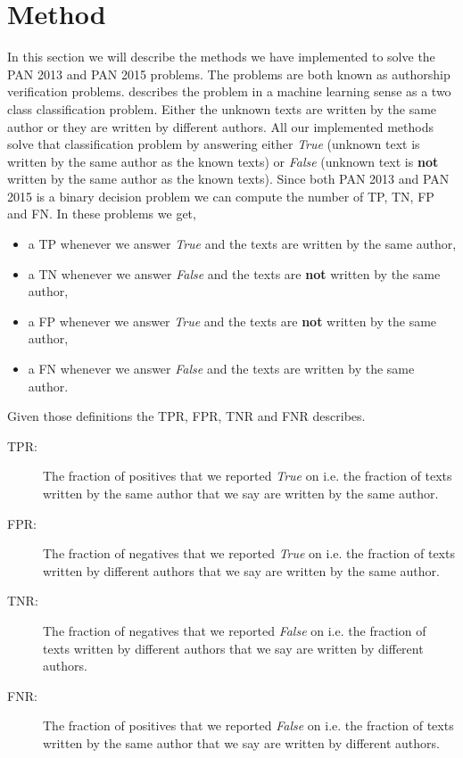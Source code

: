 \section{Method} \label{sec:method}
In this section we will describe the methods we have implemented to solve the
PAN 2013 and PAN 2015 problems. The problems are both known as authorship
verification problems. \cite{stamatos2009} describes the problem in a machine
learning sense as a two class classification problem. Either the unknown texts
are written by the same author or they are written by different authors. All
our implemented methods solve that classification problem by answering either
\textit{True} (unknown text is written by the same author as the known texts) or
\textit{False} (unknown text is \textbf{not} written by the same author as the
known texts). Since both PAN 2013 and PAN 2015 is a binary decision problem we
can compute the number of \gls{TP}, \gls{TN}, \gls{FP} and \gls{FN}. In these
problems we get,

\begin{itemize}
    \item a \gls{TP} whenever we answer \textit{True} and the texts are written
        by the same author,
    \item a \gls{TN} whenever we answer \textit{False} and the texts are
        \textbf{not} written by the same author,
    \item a \gls{FP} whenever we answer \textit{True} and the texts are
        \textbf{not} written by the same author,
    \item a \gls{FN} whenever we answer \textit{False} and the texts are written
        by the same author.
\end{itemize}

Given those definitions the \gls{TPR}, \gls{FPR}, \gls{TNR} and \gls{FNR}
describes.

\begin{description}
    \item[\gls{TPR}: ] The fraction of positives that we reported \textit{True}
        on i.e. the fraction of texts written by the same author that we say are
        written by the same author.
    \item[\gls{FPR}: ] The fraction of negatives that we reported \textit{True}
        on i.e. the fraction of texts written by different authors that we say
        are written by the same author.
    \item[\gls{TNR}: ] The fraction of negatives that we reported \textit{False}
        on i.e. the fraction of texts written by different authors that we say
        are written by different authors.
    \item[\gls{FNR}: ] The fraction of positives that we reported \textit{False}
        on i.e. the fraction of texts written by the same author that we say are
        written by different authors.
\end{description}

